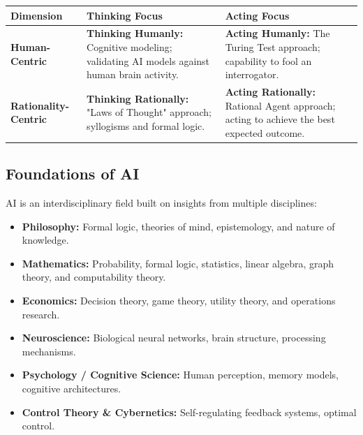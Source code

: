 \documentclass[12pt,a4paper]{article}
\renewcommand{\arraystretch}{1.45}
\begin{document}
\par\vspace{6pt}\noindent
{\renewcommand{\arraystretch}{1.4}%
\begin{tabularx}{\linewidth}{|B{3.2cm}|Y|Y|}
\hline
\textbf{Dimension} & \textbf{Thinking Focus} & \textbf{Acting Focus} \\
\hline
\textbf{Human-Centric} & \textbf{Thinking Humanly:} Cognitive modeling; validating AI models against human brain activity. & \textbf{Acting Humanly:} The Turing Test approach; capability to fool an interrogator. \\
\hline
\textbf{Rationality-Centric} & \textbf{Thinking Rationally:} "Laws of Thought" approach; syllogisms and formal logic. & \textbf{Acting Rationally:} Rational Agent approach; acting to achieve the best expected outcome. \\
\hline
\end{tabularx}}

\subsection{Foundations of AI}
AI is an interdisciplinary field built on insights from multiple disciplines:
\begin{itemize}[leftmargin=*, itemsep=3pt]
  \item \textbf{Philosophy:} Formal logic, theories of mind, epistemology, and nature of knowledge.
  \item \textbf{Mathematics:} Probability, formal logic, statistics, linear algebra, graph theory, and computability theory.
  \item \textbf{Economics:} Decision theory, game theory, utility theory, and operations research.
  \item \textbf{Neuroscience:} Biological neural networks, brain structure, processing mechanisms.
  \item \textbf{Psychology / Cognitive Science:} Human perception, memory models, cognitive architectures.
  \item \textbf{Control Theory \& Cybernetics:} Self-regulating feedback systems, optimal control.
\end{itemize}
\end{document}
